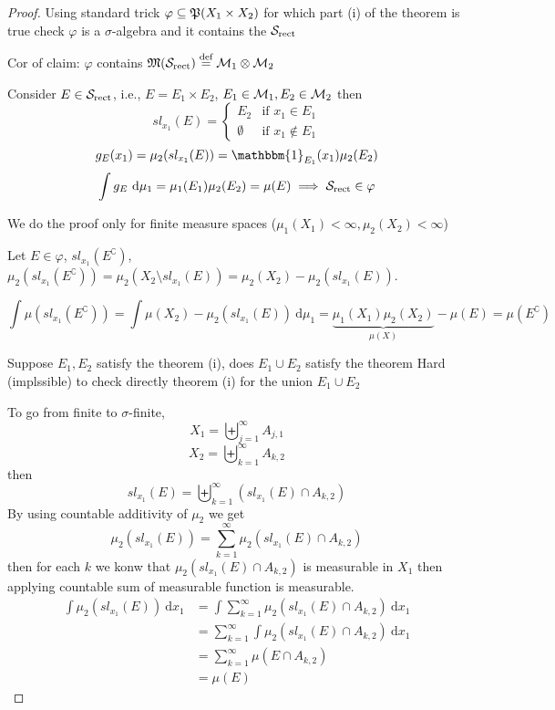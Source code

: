 \begin{proof}
  Using standard trick $\varphi \subseteq \mathfrak P(X_1 \times X_2)$ for which part (i) of the theorem is true
  check $\varphi$ is a $\sigma$-algebra and it contains the $\mathcal S_{\text{rect}}$

  Cor of claim: $\varphi$ contains $\mathfrak M(\mathcal S_{\text{rect}}) \overset{\text{def}}{=} \mathcal M_1 \otimes \mathcal M_2$

  Consider $E \in \mathcal S_{\text{rect}}$, i.e., $E = E_1 \times E_2$, $E_1 \in \mathcal M_1, E_2 \in \mathcal M_2$
  then \[sl_{x_1}(E) = \begin{cases}
    E_2  & \text{if } x_1 \in E_1 \\
    \emptyset & \text{if } x_1 \notin E_1
  \end{cases}\]
  \[g_E(x_1) = \mu_2(sl_{x_1}(E)) = \mathbbm{1}_{E_1}(x_1) \mu_2(E_2)\]
  \[\int g_E \ \mathrm{d}\mu_1 = \mu_1(E_1)\mu_2(E_2) = \mu(E)\implies \mathcal S_{\text{rect}} \in \varphi\]

  We do the proof only for finite measure spaces ($\mu_1(X_1) < \infty, \mu_2(X_2) < \infty$)

  Let $E \in \varphi$, $sl_{x_1}(E^\complement)$, $\mu_2(sl_{x_1}(E^\complement)) = \mu_2(X_2 \setminus sl_{x_1}(E)) = \mu_2(X_2) - \mu_2(sl_{x_1}(E))$.

  \[\int \mu(sl_{x_1}(E^\complement)) = \int \mu(X_2) - \mu_2(sl_{x_1}(E)) \ \mathrm{d}\mu_1 = \underbrace{\mu_1(X_1)\mu_2(X_2)}_{\mu(X)} - \mu(E) = \mu(E^\complement)\]

  Suppose $E_1, E_2$ satisfy the theorem (i), does $E_1 \cup E_2$ satisfy the theorem
  Hard (implssible) to check directly theorem (i) for the union $E_1 \cup E_2$ 

  To go from finite to $\sigma$-finite, 
  \[X_1 = \biguplus_{j=1}^\infty A_{j, 1}\]
  \[X_2 = \biguplus_{k=1}^\infty A_{k, 2}\]
  then 
  \[sl_{x_1}(E) = \biguplus_{k=1}^\infty (sl_{x_1}(E)\cap A_{k, 2})\]
  By using countable additivity of $\mu_2$ we get
  \[\mu_2(sl_{x_1}(E)) = \sum_{k=1}^\infty \mu_2(sl_{x_1}(E) \cap A_{k, 2})\]
  then for each $k$ we konw that $\mu_2(sl_{x_1}(E) \cap A_{k, 2})$ is measurable in $X_1$ then applying 
  countable sum of measurable function is measurable.
  \begin{align*}
    \int \mu_2(sl_{x_1}(E))\ \mathrm{d}x_1 &= \int \sum_{k=1}^\infty \mu_2(sl_{x_1}(E) \cap A_{k, 2})\ \mathrm{d}x_1\\ 
    &= \sum_{k=1}^\infty \int \mu_2(sl_{x_1}(E) \cap A_{k, 2})\ \mathrm{d}x_1\\
    &= \sum_{k=1}^\infty \mu(E \cap A_{k, 2})\\
    &= \mu(E)
  \end{align*}
\end{proof}

